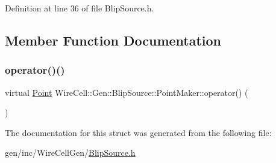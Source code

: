 Definition at line 36 of file Blip\+Source.\+h.



\subsection{Member Function Documentation}
\mbox{\label{struct_wire_cell_1_1_gen_1_1_blip_source_1_1_point_maker_a582d2825f5dd2933583f7da351418c79}} 
\subsubsection{\texorpdfstring{operator()()}{operator()()}}
{\footnotesize\ttfamily virtual \hyperlink{namespace_wire_cell_ab2b2565fa6432efbb4513c14c988cda9}{Point} Wire\+Cell\+::\+Gen\+::\+Blip\+Source\+::\+Point\+Maker\+::operator() (\begin{DoxyParamCaption}{ }\end{DoxyParamCaption})\hspace{0.3cm}{\ttfamily [pure virtual]}}



The documentation for this struct was generated from the following file\+:\begin{DoxyCompactItemize}
\item 
gen/inc/\+Wire\+Cell\+Gen/\hyperlink{_blip_source_8h}{Blip\+Source.\+h}\end{DoxyCompactItemize}
